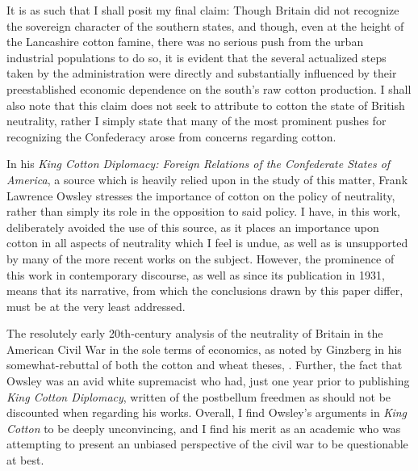 It is as such that I shall posit my final claim: Though Britain did not recognize the sovereign character of the southern states, and though, 
even at the height of the Lancashire cotton famine, there was no serious push from the urban industrial populations to do so, it is evident that the several actualized
steps taken by the administration were directly and substantially influenced by their preestablished economic dependence on the south's raw cotton production. I shall
also note that this claim does not seek to attribute to cotton the state of British neutrality, rather I simply state that many of the most prominent pushes for
recognizing the Confederacy arose from concerns regarding cotton.

\hfill

In his \textit{King Cotton Diplomacy: Foreign Relations of the Confederate States of America}, a source which is heavily relied upon in the study of this matter,
Frank Lawrence Owsley stresses the importance of cotton on the policy of neutrality, rather than simply its role in the opposition to said policy. I have, in this work,
deliberately avoided the use of this source, as it places an importance upon cotton in all aspects of neutrality which I feel is undue, as well as is unsupported by
many of the more recent works on the subject. However, the prominence of this work in contemporary discourse, as well as since its publication in 1931, means that
its narrative, from which the conclusions drawn by this paper differ, must be at the very least addressed.

The resolutely early 20th-century analysis of the neutrality of Britain in the American Civil War in the sole terms of economics, as noted by Ginzberg in his
somewhat-rebuttal of both the cotton and wheat theses,  \autocite{ginzbergeconomicsbritish1936}. Further, the fact that Owsley was an avid white supremacist who had, just one year prior to publishing
\textit{King Cotton Diplomacy}, written of the postbellum freedmen as \Autocite[62]{owsleyIrrepressibleConflict1930} should not be discounted
when regarding his works. Overall, I find Owsley's arguments in \textit{King Cotton} to be deeply unconvincing, and I find his merit as an academic who was attempting to
present an unbiased perspective of the civil war to be questionable at best.